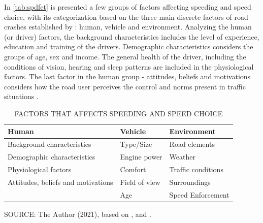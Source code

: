 
In \autoref{tab:spdfct} is presented a few groups of factors affecting speeding and speed choice, with its categorization based on the three main discrete factors of road crashes established by \textcite{Haddon1980}: human, vehicle and environment. Analyzing the human (or driver) factors, the background characteristics includes the level of experience, education and training of the drivers. Demographic characteristics considers the groups of age, sex and income. The general health of the driver, including the conditions of vision, hearing and sleep patterns are included in the physiological factors. The last factor in the human group - attitudes, beliefs and motivations considers how the road user perceives the control and norms present in traffic situations \cite{Richard2013a}.  

\begin{table}[!hbtp]
    \footnotesize
    \captionsetup{justification=raggedright,
        singlelinecheck=false,
        font=footnotesize}
    \caption{FACTORS THAT AFFECTS SPEEDING AND SPEED CHOICE}
    \centering
    \begin{tabular}{l|l|l}
    \hline
    \textbf{Human}                  & \textbf{Vehicle} & \textbf{Environment} \\ \hline
    Background characteristics      & Type/Size        & Road elements        \\
    Demographic characteristics     & Engine power     & Weather              \\
    Physiological factors           & Comfort          & Traffic conditions   \\
    Attitudes, beliefs and motivations & Field of view    & Surroundings    \\
                                    & Age              & Speed Enforcement    \\ \hline
\end{tabular}
    \label{tab:spdfct}
    \par \vspace{2mm} \footnotesize \raggedright
    SOURCE: The Author (2021), based on \textcite{Richard2013a}, \textcite{Shinar2017} and \textcite{WHO2008}.
\end{table}



